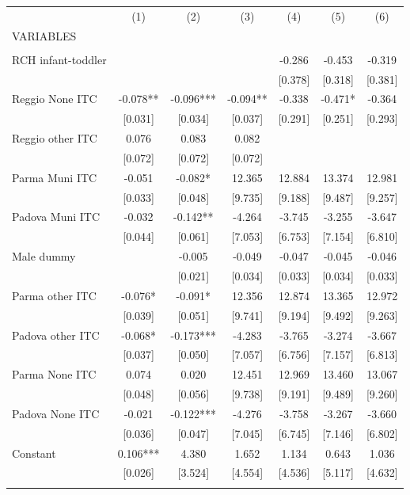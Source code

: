 \begin{tabular}{lcccccc} \hline
 & (1) & (2) & (3) & (4) & (5) & (6) \\
VARIABLES &  &  &  &  &  &  \\ \hline
 &  &  &  &  &  &  \\
RCH infant-toddler &  &  &  & -0.286 & -0.453 & -0.319 \\
 &  &  &  & [0.378] & [0.318] & [0.381] \\
Reggio None ITC & -0.078** & -0.096*** & -0.094** & -0.338 & -0.471* & -0.364 \\
 & [0.031] & [0.034] & [0.037] & [0.291] & [0.251] & [0.293] \\
Reggio other ITC & 0.076 & 0.083 & 0.082 &  &  &  \\
 & [0.072] & [0.072] & [0.072] &  &  &  \\
Parma Muni ITC & -0.051 & -0.082* & 12.365 & 12.884 & 13.374 & 12.981 \\
 & [0.033] & [0.048] & [9.735] & [9.188] & [9.487] & [9.257] \\
Padova Muni ITC & -0.032 & -0.142** & -4.264 & -3.745 & -3.255 & -3.647 \\
 & [0.044] & [0.061] & [7.053] & [6.753] & [7.154] & [6.810] \\
Male dummy &  & -0.005 & -0.049 & -0.047 & -0.045 & -0.046 \\
 &  & [0.021] & [0.034] & [0.033] & [0.034] & [0.033] \\
Parma other ITC & -0.076* & -0.091* & 12.356 & 12.874 & 13.365 & 12.972 \\
 & [0.039] & [0.051] & [9.741] & [9.194] & [9.492] & [9.263] \\
Padova other ITC & -0.068* & -0.173*** & -4.283 & -3.765 & -3.274 & -3.667 \\
 & [0.037] & [0.050] & [7.057] & [6.756] & [7.157] & [6.813] \\
Parma None ITC & 0.074 & 0.020 & 12.451 & 12.969 & 13.460 & 13.067 \\
 & [0.048] & [0.056] & [9.738] & [9.191] & [9.489] & [9.260] \\
Padova None ITC & -0.021 & -0.122*** & -4.276 & -3.758 & -3.267 & -3.660 \\
 & [0.036] & [0.047] & [7.045] & [6.745] & [7.146] & [6.802] \\
Constant & 0.106*** & 4.380 & 1.652 & 1.134 & 0.643 & 1.036 \\
 & [0.026] & [3.524] & [4.554] & [4.536] & [5.117] & [4.632] \\
 &  &  &  &  &  &  \\

\end{tabular}
